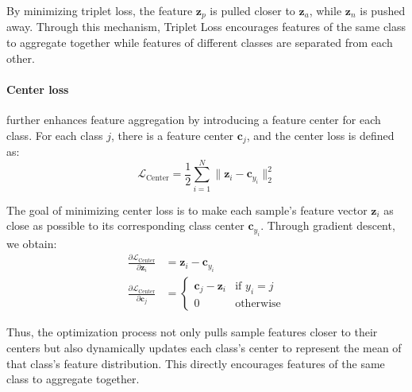 By minimizing triplet loss, the feature $\mathbf{z}_p$ is pulled closer to $\mathbf{z}_a$, while $\mathbf{z}_n$ is pushed away. Through this mechanism, Triplet Loss encourages features of the same class to aggregate together while features of different classes are separated from each other.

\paragraph{Center loss} further enhances feature aggregation by introducing a feature center for each class. For each class $j$, there is a feature center $\mathbf{c}_j$, and the center loss is defined as:
\begin{equation}
\mathcal{L}_{\text{Center}} = \frac{1}{2} \sum_{i=1}^{N} \| \mathbf{z}_i - \mathbf{c}_{y_i} \|_2^2
\end{equation}

The goal of minimizing center loss is to make each sample's feature vector $\mathbf{z}_i$ as close as possible to its corresponding class center $\mathbf{c}_{y_i}$. Through gradient descent, we obtain:
\begin{align}
\frac{\partial \mathcal{L}_{\text{Center}}}{\partial \mathbf{z}_i} &= \mathbf{z}_i - \mathbf{c}_{y_i} \\
\frac{\partial \mathcal{L}_{\text{Center}}}{\partial \mathbf{c}_j} &= \begin{cases}
\mathbf{c}_j - \mathbf{z}_i & \text{if } y_i = j \\
0 & \text{otherwise}
\end{cases}
\end{align}

Thus, the optimization process not only pulls sample features closer to their centers but also dynamically updates each class's center to represent the mean of that class's feature distribution. This directly encourages features of the same class to aggregate together.





